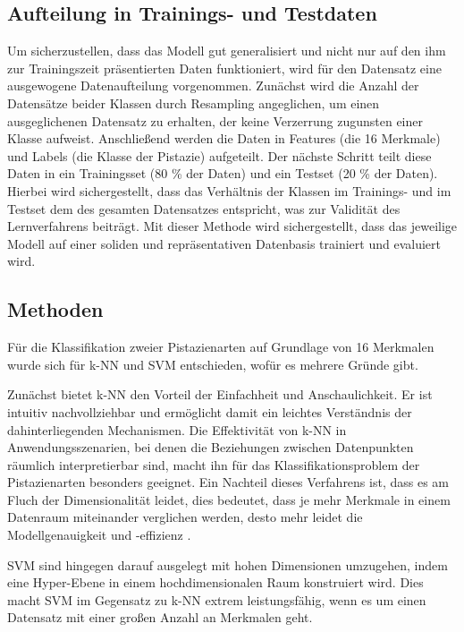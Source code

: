 \subsection{Aufteilung in Trainings- und Testdaten}
\label{sec:aufteilung-in-trainings-und-testdaten}

 Um sicherzustellen, dass das Modell gut generalisiert und nicht nur auf den ihm zur Trainingszeit präsentierten Daten funktioniert, wird für den Datensatz eine ausgewogene Datenaufteilung vorgenommen. Zunächst wird die Anzahl der Datensätze beider Klassen durch \grqq{}Resampling\glqq{} angeglichen, um einen ausgeglichenen Datensatz zu erhalten, der keine Verzerrung zugunsten einer Klasse aufweist. Anschließend werden die Daten in Features (die 16 Merkmale) und Labels (die Klasse der Pistazie) aufgeteilt. Der nächste Schritt teilt diese Daten in ein Trainingsset (80 \% der Daten) und ein Testset (20 \% der Daten). Hierbei wird sichergestellt, dass das Verhältnis der Klassen im Trainings- und im Testset dem des gesamten Datensatzes entspricht, was zur Validität des Lernverfahrens beiträgt. Mit dieser Methode wird sichergestellt, dass das jeweilige Modell auf einer soliden und repräsentativen Datenbasis trainiert und evaluiert wird.

\subsection{Methoden}

Für die Klassifikation zweier Pistazienarten auf Grundlage von 16 Merkmalen wurde sich für k-NN und SVM entschieden, wofür es mehrere Gründe gibt.

Zunächst bietet k-NN den Vorteil der Einfachheit und Anschaulichkeit. 
Er ist intuitiv nachvollziehbar und ermöglicht damit ein leichtes Verständnis der dahinterliegenden Mechanismen.
Die Effektivität von k-NN in Anwendungsszenarien, bei denen die Beziehungen zwischen Datenpunkten räumlich interpretierbar sind, macht ihn für das Klassifikationsproblem der Pistazienarten besonders geeignet.
Ein Nachteil dieses Verfahrens ist, dass es am \glqq{}Fluch der Dimensionalität\grqq{} leidet, dies bedeutet, dass je mehr Merkmale in einem Datenraum miteinander verglichen werden, desto mehr leidet die Modellgenauigkeit und -effizienz \cite{Lang.2023b}.

SVM sind hingegen darauf ausgelegt mit hohen Dimensionen umzugehen, indem eine Hyper-Ebene in einem hochdimensionalen Raum konstruiert wird\cite{Cortes.1995}. Dies macht SVM im Gegensatz zu k-NN extrem leistungsfähig, wenn es um einen Datensatz mit einer großen Anzahl an Merkmalen geht.

